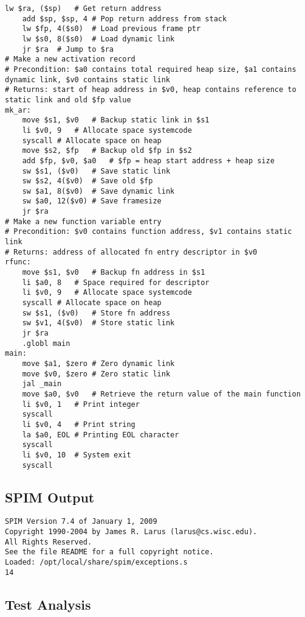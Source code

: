 \begin{lstlisting}[showstringspaces=false,breaklines=true,backgroundcolor=\color{light-gray}, captionpos=b]
	lw $ra, ($sp)	# Get return address
	add $sp, $sp, 4	# Pop return address from stack
	lw $fp, 4($s0)	# Load previous frame ptr
	lw $s0, 8($s0)	# Load dynamic link
	jr $ra	# Jump to $ra
# Make a new activation record
# Precondition: $a0 contains total required heap size, $a1 contains dynamic link, $v0 contains static link
# Returns: start of heap address in $v0, heap contains reference to static link and old $fp value
mk_ar:
	move $s1, $v0	# Backup static link in $s1
	li $v0, 9	# Allocate space systemcode
	syscall	# Allocate space on heap
	move $s2, $fp	# Backup old $fp in $s2
	add $fp, $v0, $a0	# $fp = heap start address + heap size
	sw $s1, ($v0)	# Save static link
	sw $s2, 4($v0)	# Save old $fp
	sw $a1, 8($v0)	# Save dynamic link
	sw $a0, 12($v0)	# Save framesize
	jr $ra
# Make a new function variable entry
# Precondition: $v0 contains function address, $v1 contains static link
# Returns: address of allocated fn entry descriptor in $v0
rfunc:
	move $s1, $v0	# Backup fn address in $s1
	li $a0, 8	# Space required for descriptor
	li $v0, 9	# Allocate space systemcode
	syscall	# Allocate space on heap
	sw $s1, ($v0)	# Store fn address
	sw $v1, 4($v0)	# Store static link
	jr $ra
	.globl main
main:
	move $a1, $zero	# Zero dynamic link
	move $v0, $zero	# Zero static link
	jal _main
	move $a0, $v0	# Retrieve the return value of the main function
	li $v0, 1	# Print integer
	syscall
	li $v0, 4	# Print string
	la $a0, EOL	# Printing EOL character
	syscall
	li $v0, 10	# System exit
	syscall

\end{lstlisting}\subsection{SPIM Output}
\begin{verbatim}
SPIM Version 7.4 of January 1, 2009
Copyright 1990-2004 by James R. Larus (larus@cs.wisc.edu).
All Rights Reserved.
See the file README for a full copyright notice.
Loaded: /opt/local/share/spim/exceptions.s
14
\end{verbatim}\subsection{Test Analysis}

